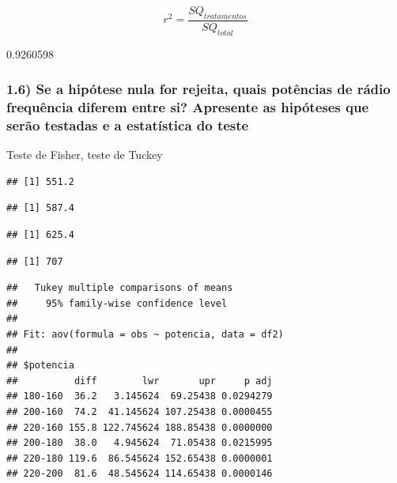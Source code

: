 \documentclass[
  a4paper]{article}
\begin{document}
\[r^2 = \frac{SQ_{tratamentos}}{SQ_{total}}\]

0.9260598

\hypertarget{se-a-hipuxf3tese-nula-for-rejeita-quais-potuxeancias-de-ruxe1dio-frequuxeancia-diferem-entre-si-apresente-as-hipuxf3teses-que-seruxe3o-testadas-e-a-estatuxedstica-do-teste}{%
\subsubsection{1.6) Se a hipótese nula for rejeita, quais potências de
rádio frequência diferem entre si? Apresente as hipóteses que serão
testadas e a estatística do
teste}\label{se-a-hipuxf3tese-nula-for-rejeita-quais-potuxeancias-de-ruxe1dio-frequuxeancia-diferem-entre-si-apresente-as-hipuxf3teses-que-seruxe3o-testadas-e-a-estatuxedstica-do-teste}}

Teste de Fisher, teste de Tuckey

\begin{verbatim}
## [1] 551.2
\end{verbatim}

\begin{verbatim}
## [1] 587.4
\end{verbatim}

\begin{verbatim}
## [1] 625.4
\end{verbatim}

\begin{verbatim}
## [1] 707
\end{verbatim}

\begin{verbatim}
##   Tukey multiple comparisons of means
##     95% family-wise confidence level
## 
## Fit: aov(formula = obs ~ potencia, data = df2)
## 
## $potencia
##          diff        lwr       upr     p adj
## 180-160  36.2   3.145624  69.25438 0.0294279
## 200-160  74.2  41.145624 107.25438 0.0000455
## 220-160 155.8 122.745624 188.85438 0.0000000
## 200-180  38.0   4.945624  71.05438 0.0215995
## 220-180 119.6  86.545624 152.65438 0.0000001
## 220-200  81.6  48.545624 114.65438 0.0000146
\end{verbatim}
\end{document}

